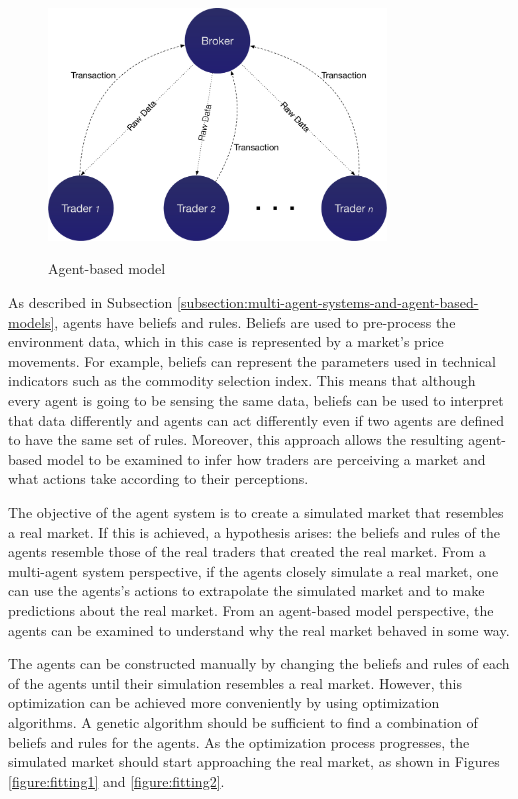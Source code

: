 \documentclass[review]{elsarticle}
\begin{document}
\begin{figure}
\caption{Agent-based model}
\centering
\includegraphics[width=0.8\textwidth]{img/agent-model.pdf}
\label{figure:agent-based-model}
\end{figure}

As described in Subsection \ref{subsection:multi-agent-systems-and-agent-based-models}, agents have beliefs and rules. Beliefs are used to pre-process the environment data, which in this case is represented by a market's price movements. For example, beliefs can represent the parameters used in technical indicators such as the commodity selection index. This means that although every agent is going to be sensing the same data, beliefs can be used to interpret that data differently and agents can act differently even if two agents are defined to have the same set of rules. Moreover, this approach allows the resulting agent-based model to be examined to infer how traders are perceiving a market and what actions take according to their perceptions.

The objective of the agent system is to create a simulated market that resembles a real market. If this is achieved, a hypothesis arises: the beliefs and rules of the agents resemble those of the real traders that created the real market. From a multi-agent system perspective, if the agents closely simulate a real market, one can use the agents's actions to extrapolate the simulated market and to make predictions about the real market. From an agent-based model perspective, the agents can be examined to understand why the real market behaved in some way.

The agents can be constructed manually by changing the beliefs and rules of each of the agents until their simulation resembles a real market. However, this optimization can be achieved more conveniently by using optimization algorithms. A genetic algorithm should be sufficient to find a combination of beliefs and rules for the agents. As the optimization process progresses, the simulated market should start approaching the real market, as shown in Figures \ref{figure:fitting1} and \ref{figure:fitting2}.
\end{document}
